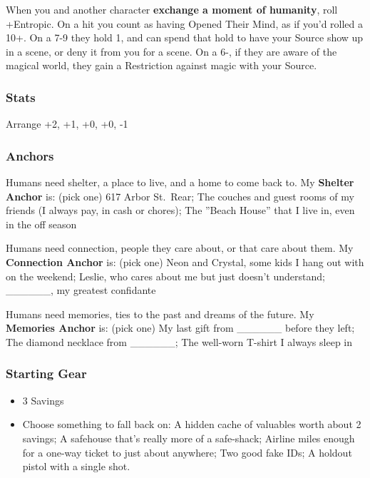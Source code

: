 \documentclass[
]{article}
\providecommand{\tightlist}{%
  \setlength{\itemsep}{0pt}\setlength{\parskip}{0pt}}
\begin{document}
When you and another character \textbf{exchange a moment of humanity},
roll +Entropic. On a hit you count as having Opened Their Mind, as if
you'd rolled a 10+. On a 7-9 they hold 1, and can spend that hold to
have your Source show up in a scene, or deny it from you for a scene. On
a 6-, if they are aware of the magical world, they gain a Restriction
against magic with your Source.

\hypertarget{stats-4}{%
\subsubsection{Stats}\label{stats-4}}

Arrange +2, +1, +0, +0, -1

\hypertarget{anchors-3}{%
\subsubsection{Anchors}\label{anchors-3}}

Humans need shelter, a place to live, and a home to come back to. My
\textbf{Shelter Anchor} is: (pick one) 617 Arbor St.~Rear; The couches
and guest rooms of my friends (I always pay, in cash or chores); The
''Beach House'' that I live in, even in the off season

Humans need connection, people they care about, or that care about them.
My \textbf{Connection Anchor} is: (pick one) Neon and Crystal, some kids
I hang out with on the weekend; Leslie, who cares about me but just
doesn't understand; \_\_\_\_\_\_, my greatest confidante

Humans need memories, ties to the past and dreams of the future. My
\textbf{Memories Anchor} is: (pick one) My last gift from \_\_\_\_\_\_
before they left; The diamond necklace from \_\_\_\_\_\_; The well-worn
T-shirt I always sleep in

\hypertarget{starting-gear-3}{%
\subsubsection{Starting Gear}\label{starting-gear-3}}

\begin{itemize}
\tightlist
\item
  3 Savings
\item
  Choose something to fall back on: A hidden cache of valuables worth
  about 2 savings; A safehouse that's really more of a safe-shack;
  Airline miles enough for a one-way ticket to just about anywhere; Two
  good fake IDs; A holdout pistol with a single shot.
\end{itemize}
\end{document}

